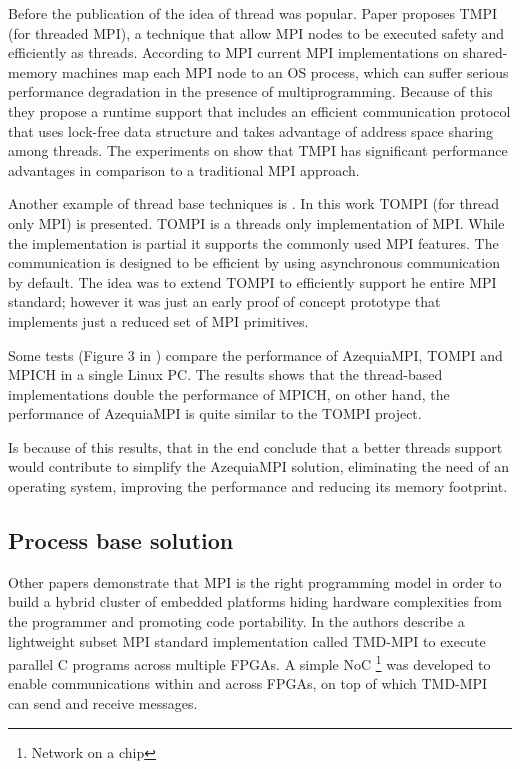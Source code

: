 Before the publication of \cite{Gallego} the idea of thread was popular.
Paper \cite{Tang} proposes TMPI (for threaded MPI), a technique that  allow MPI
nodes to be executed safety and efficiently as threads. According to
\cite{Tang} MPI current MPI implementations on shared-memory machines map each
MPI node to an OS process, which can suffer serious performance degradation in
the presence of multiprogramming. Because of this they propose a runtime
support that includes an efficient communication protocol that uses lock-free
data structure and takes advantage of address space sharing among threads. The
experiments on \cite{Tang} show that TMPI has significant performance
advantages in comparison to a traditional MPI approach.

Another example of thread base techniques is \cite{Demaine} . In this work
TOMPI (for thread only MPI) is presented. TOMPI is a threads only
implementation of MPI. While the implementation is partial it supports the
commonly used MPI features. The communication is designed to be efficient by
using asynchronous communication by default. The idea was to extend TOMPI to
efficiently support he entire MPI standard; however it was just an early proof
of concept prototype that implements just a reduced set of MPI primitives. 

Some tests (Figure 3 in \cite{Gallego}) compare the performance of AzequiaMPI,
TOMPI and MPICH in a single Linux PC. The results shows that the thread-based
implementations double the performance of MPICH, on other hand, the performance
of AzequiaMPI is quite similar to the TOMPI project. 

Is because of this results, that in the end \cite{Gallego} conclude that a better
threads support would contribute to simplify the AzequiaMPI solution,
eliminating the need of an operating system, improving the performance and
reducing its memory footprint. 

\subsection{Process base solution}

Other papers \cite{Saldana-Chow} \cite{Williams} demonstrate that MPI is the
right programming model in order to build a hybrid cluster of embedded
platforms hiding hardware complexities from the programmer and promoting code
portability. In \cite{Saldana-Chow} the authors describe a lightweight subset
MPI standard implementation called TMD-MPI to execute parallel C programs
across multiple FPGAs. A simple NoC \footnote{Network on a chip} was developed
to enable communications within and across FPGAs, on top of which TMD-MPI can
send and receive messages. 


